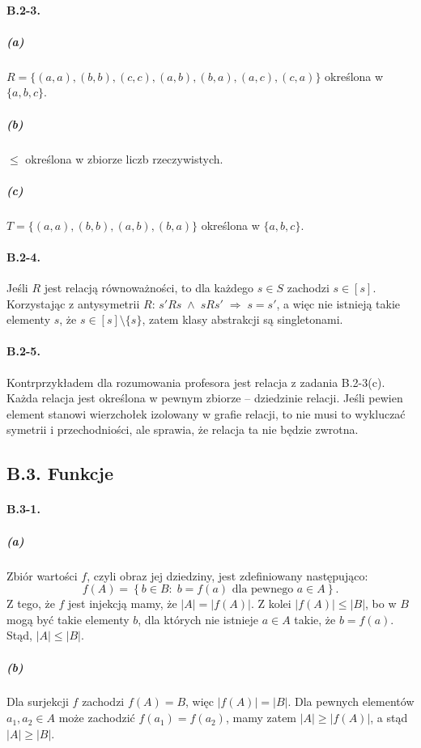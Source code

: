 \paragraph{B.2-3.}
\subparagraph{(a)}
$R = \{(a,a),(b,b),(c,c),(a,b),(b,a),(a,c),(c,a)\}$ określona w $\{ a,b,c\}$.

\subparagraph{(b)}
$\le$ określona w zbiorze liczb rzeczywistych.

\subparagraph{(c)}
$T = \{(a,a),(b,b),(a,b),(b,a)\}$ określona w $\{ a,b,c\}$.

\paragraph{B.2-4.}
Jeśli $R$ jest relacją równoważności, to dla każdego $s\in S$ zachodzi $s\in[s]$. Korzystając z antysymetrii $R$: $s'Rs\;\wedge\;sRs'\;\Rightarrow\;s=s'$, a więc nie istnieją takie elementy $s$, że $s\in[s]\setminus\{ s\}$, zatem klasy abstrakcji są singletonami.

\paragraph{B.2-5.}
Kontrprzykładem dla rozumowania profesora jest relacja z zadania B.2-3(c). Każda relacja jest określona w pewnym zbiorze -- dziedzinie relacji. Jeśli pewien element stanowi wierzchołek izolowany w grafie relacji, to nie musi to wykluczać symetrii i przechodniości, ale sprawia, że relacja ta nie będzie zwrotna.

\subsection*{B.3. Funkcje}

\paragraph{B.3-1.}
\subparagraph{(a)}
Zbiór wartości $f$, czyli obraz jej dziedziny, jest zdefiniowany następująco:
\[
	f(A) = \left\{ b\in B:\;b=f(a)\mbox{ dla pewnego }a\in A\right\}.
\]
Z tego, że $f$ jest injekcją mamy, że $|A|=|f(A)|$. Z kolei $|f(A)|\le |B|$, bo w $B$ mogą być takie elementy $b$, dla których nie istnieje $a\in A$ takie, że $b=f(a)$. Stąd, $|A|\le |B|$.

\subparagraph{(b)}
Dla surjekcji $f$ zachodzi $f(A)=B$, więc $|f(A)|=|B|$. Dla pewnych elementów $a_1,a_2\in A$ może zachodzić $f(a_1)=f(a_2)$, mamy zatem $|A|\ge |f(A)|$, a stąd $|A|\ge |B|$.
\bigskip

